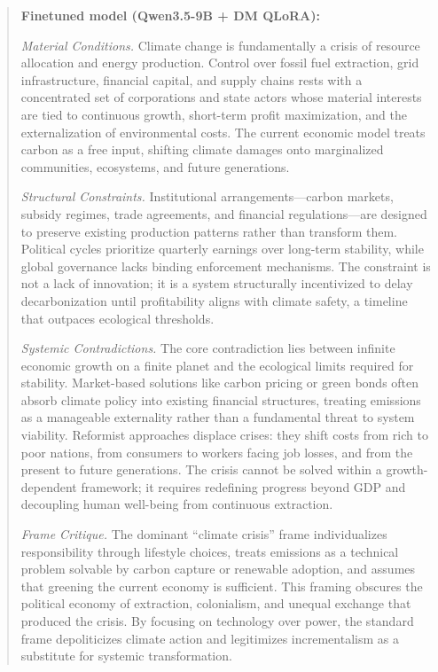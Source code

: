 \documentclass[11pt]{article}
\begin{document}
\begin{quote}
\noindent\textbf{Finetuned model (Qwen3.5-9B + DM QLoRA):}

\textit{Material Conditions.} Climate change is fundamentally a crisis of resource allocation and energy production. Control over fossil fuel extraction, grid infrastructure, financial capital, and supply chains rests with a concentrated set of corporations and state actors whose material interests are tied to continuous growth, short-term profit maximization, and the externalization of environmental costs. The current economic model treats carbon as a free input, shifting climate damages onto marginalized communities, ecosystems, and future generations.

\textit{Structural Constraints.} Institutional arrangements---carbon markets, subsidy regimes, trade agreements, and financial regulations---are designed to preserve existing production patterns rather than transform them. Political cycles prioritize quarterly earnings over long-term stability, while global governance lacks binding enforcement mechanisms. The constraint is not a lack of innovation; it is a system structurally incentivized to delay decarbonization until profitability aligns with climate safety, a timeline that outpaces ecological thresholds.

\textit{Systemic Contradictions.} The core contradiction lies between infinite economic growth on a finite planet and the ecological limits required for stability. Market-based solutions like carbon pricing or green bonds often absorb climate policy into existing financial structures, treating emissions as a manageable externality rather than a fundamental threat to system viability. Reformist approaches displace crises: they shift costs from rich to poor nations, from consumers to workers facing job losses, and from the present to future generations. The crisis cannot be solved within a growth-dependent framework; it requires redefining progress beyond GDP and decoupling human well-being from continuous extraction.

\textit{Frame Critique.} The dominant ``climate crisis'' frame individualizes responsibility through lifestyle choices, treats emissions as a technical problem solvable by carbon capture or renewable adoption, and assumes that greening the current economy is sufficient. This framing obscures the political economy of extraction, colonialism, and unequal exchange that produced the crisis. By focusing on technology over power, the standard frame depoliticizes climate action and legitimizes incrementalism as a substitute for systemic transformation.


\end{quote}
\end{document}
